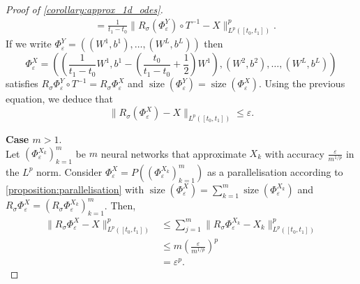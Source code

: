 \documentclass[12pt]{article}
\theoremstyle{remark}
\theoremstyle{plain}
\numberwithin{equation}{section}
\DeclareMathOperator{\Size}{size}
\begin{document}
\begin{proof}[Proof of \cref{corollary:approx_1d_odes}]
\begin{align*}
        &=\frac{1}{t_1-t_0}\|R_\sigma(\Phi_\varepsilon^Y)\circ T^{-1} - X\|_{L^p([t_0,t_1])}^p.
    \end{align*}
    If we write $\Phi_\varepsilon^Y = ((W^1, b^1),\dots,(W^L,b^L))$ then 
    \begin{equation*}
        \Phi_\varepsilon^X = ((\frac{1}{t_1-t_0}W^1, b^1 - \left(\frac{t_0}{t_1-t_0} + \frac 1 2\right)W^1), (W^2, b^2), \dots, (W^L, b^L))
    \end{equation*}
    satisfies $R_\sigma\Phi_\varepsilon^Y \circ T^{-1} = R_\sigma\Phi_\varepsilon^X$ and $\Size(\Phi_\varepsilon^Y) = \Size(\Phi_\varepsilon^X)$.
    Using the previous equation, we deduce that
    \begin{equation*}
        \|R_\sigma(\Phi_\varepsilon^X) - X\|_{L^p([t_0,t_1])} \leq \varepsilon.
    \end{equation*}

    \textbf{Case $m > 1$}.\\
    Let $(\Phi_\varepsilon^{X_k})_{k=1}^m$ be $m$ neural networks that approximate $X_k$ with accuracy $\frac{\varepsilon}{m^{1/p}}$ in the $L^p$ norm.
    Consider $\Phi_\varepsilon^X = P((\Phi_\varepsilon^{X_k})_{k=1}^m)$ as a parallelisation according to \cref{proposition:parallelisation} with $\Size(\Phi_\varepsilon^X) = \sum_{k=1}^m \Size(\Phi_\varepsilon^{X_k})$ and $R_\sigma \Phi_\varepsilon^X = (R_\sigma \Phi_\varepsilon^{X_k})_{k=1}^m$.
    Then,
    \begin{align*}
        \|R_\sigma \Phi_\varepsilon^X - X\|_{L^p([t_0,t_1])}^p &\leq \sum_{j=1}^m \|R_\sigma \Phi_\varepsilon^{X_k} - X_k\|_{L^p([t_0,t_1])}^p\\
        &\leq m \left(\frac{\varepsilon}{m^{1/p}}\right)^p\\
        &=\varepsilon^p.
    \end{align*}
\end{proof}
    
\end{document}

